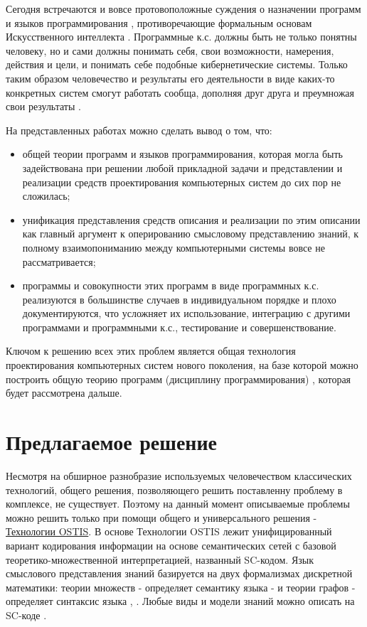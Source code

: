 Сегодня встречаются и вовсе протовоположные суждения о назначении программ и языков программирования \cite{Rapaport2020}, противоречающие формальным основам Искусственного интеллекта \cite{Grimmelmann2022}. Программные к.с. должны быть не только понятны человеку, но и сами должны понимать себя, свои возможности, намерения, действия и цели, и понимать себе подобные кибернетические системы. Только таким образом человечество и результаты его деятельности в виде каких-то конкретных систем смогут работать сообща, дополняя друг друга и преумножая свои результаты \cite{Golenkov2012}.

На представленных работах можно сделать вывод о том, что:
\begin{itemize}
    \item общей теории программ и языков программирования, которая могла быть задействована при решении любой прикладной задачи и представлении и реализации средств проектирования компьютерных систем до сих пор не сложилась;
    \item унификация представления средств описания и реализации по этим описании как главный аргумент к оперированию смысловому представлению знаний, к полному взаимопониманию между компьютерными системы вовсе не рассматривается;
    \item программы и совокупности этих программ в виде программных к.с. реализуются в большинстве случаев в индивидуальном порядке и плохо документируются, что усложняет их использование, интеграцию с другими программами и программными к.с., тестирование и совершенствование.
\end{itemize}

Ключом к решению всех этих проблем является общая технология проектирования компьютерных систем нового поколения, на базе которой можно построить общую теорию программ (дисциплину программирования) \cite{Deikstra1978}, которая будет рассмотрена дальше.

\section{Предлагаемое решение}

Несмотря на обширное разнобразие используемых человечеством классических технологий, общего решения, позволяющего решить поставленну проблему в комплексе, не существует. Поэтому на данный момент описываемые проблемы можно решить только при помощи общего и универсального решения - \underline{Технологии OSTIS}. В основе Технологии OSTIS лежит унифицированный вариант кодирования информации на основе семантических сетей с базовой теоретико-множественной интерпретацией, названный SC-кодом. Язык смыслового представления знаний базируется на двух формализмах дискретной математики: теории множеств - определяет семантику языка - и теории графов - определяет синтаксис языка \cite{Reinhard}, \cite{Diskrete_Math}. Любые виды и модели знаний можно описать на SC-коде \cite{Standard2021}.

